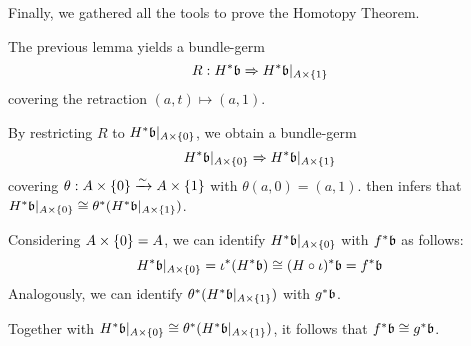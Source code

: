 \begin{myparagraph} Finally, we gathered all the tools to prove the Homotopy Theorem. \end{myparagraph}

\begin{myproof} The previous lemma yields a bundle-germ\[ \germdef{R}{\ind{H}\bb}{\ind{H}\bb[\cylup{A}]} \] covering the retraction $(a, t) \mapsto (a, 1)$.

By restricting $R$ to $\ind{H}\bb[\cyldown{A}]$, we obtain a bundle-germ \[ \germ{\ind{H}\bb[\cyldown{A}]}{\ind{H}\bb[\cylup{A}]} \] covering $\theta: A \times{} \{0\} \xrightarrow{\sim} A \times{} \{1\}$ with $\theta(a, 0) = (a, 1)$.  then infers that $\ind{H}\bb[\cyldown{A}] \cong \ind{\theta}(\ind{H}\bb[\cylup{A}])$.

Considering $A \times{} \{0\} = A$, we can identify $\ind{H}\bb[\cyldown{A}]$ with $\ind{f}\bb$ as follows: \[ \ind{H}\bb[A \cross \{0\}] = \ind{\iota}(\ind{H}\bb) \cong \ind{(H \circ \iota)}\bb = \ind{f}\bb \] Analogously, we can identify $\ind{\theta}(\ind{H}\bb[\cylup{A}])$ with $\ind{g}\bb$.

Together with $\ind{H}\bb[\cyldown{A}] \cong \ind{\theta}(\ind{H}\bb[\cylup{A}])$, it follows that $\ind{f}\bb \cong \ind{g}\bb$. \end{myproof}